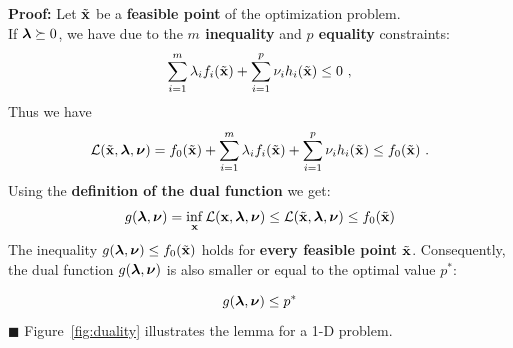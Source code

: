    \textbf{Proof:}
  Let $\tilde{\bm{\mathrm{x}}}$ be a \textbf{feasible point} of the optimization problem. \\[.3cm]
  If $\bm{\mathrm{\lambda}}\succeq 0$, we have due to the \textbf{$m$ inequality} and \textbf{$p$ equality} constraints:
  \begin{displaymath}
    \sum_{i=1}^m \lambda_i f_i(\tilde{\bm{\mathrm{x}}}) + 
    \sum_{i=1}^p\nu_i h_i(\tilde{\bm{\mathrm{x}}}) 
    \leq 0~,
  \end{displaymath}
  Thus we have
  \begin{displaymath}
    \mathcal L(\tilde{\bm{\mathrm{x}}},\bm{\mathrm{\lambda}},\bm{\mathrm{\nu}}) =
    f_0 ({\tilde{\bm{\mathrm{x}}}}) + 
    \sum_{i=1}^m\lambda_i f_i(\tilde{\bm{\mathrm{x}}}) + \sum_{i=1}^p\nu_i h_i(\tilde{\bm{\mathrm{x}}}) 
    \leq f_0 ({\tilde{\bm{\mathrm{x}}}})~.
  \end{displaymath}
  Using the \textbf{definition of the dual function} we get:
  \begin{displaymath}
    g(\bm{\mathrm{\lambda}},\bm{\mathrm{\nu}}) = 
    \inf_{{\bm{\mathrm{x}}}} \mathcal L({\bm{\mathrm{x}}},\bm{\mathrm{\lambda}}, \bm{\mathrm{\nu}}) \leq
    \mathcal L(\tilde{\bm{\mathrm{x}}}, \bm{\mathrm{\lambda}}, \bm{\mathrm{\nu}}) \leq
    f_0(\tilde{\bm{\mathrm{x}}})
  \end{displaymath}
  The inequality $g(\bm{\mathrm{\lambda}},\bm{\mathrm{\nu}}) \leq f_0(\tilde{\bm{\mathrm{x}}})$ holds for \textbf{every feasible point $\tilde{\bm{\mathrm{x}}}$}. Consequently, the dual function $g(\bm{\mathrm{\lambda}},\bm{\mathrm{\nu}})$ is also smaller or equal to the optimal value $p^*$:

  \begin{displaymath}
    g(\bm{\mathrm{\lambda}},\bm{\mathrm{\nu}}) \leq p^*
  \end{displaymath}
  \hfill $\blacksquare$
  Figure~\ref{fig:duality} illustrates the lemma for a 1-D problem.

